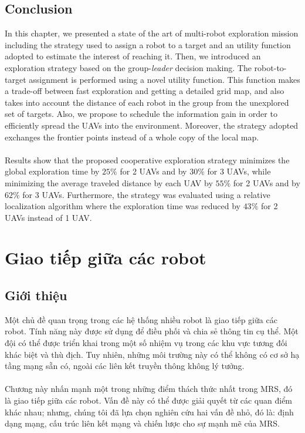\documentclass[11pt,openany]{book}
\begin{document}
\section{Conclusion}
In this chapter, we presented a state of the art of multi-robot exploration mission including the strategy used to assign a robot to a target and an utility function adopted to estimate the interest of reaching it. Then, we introduced an exploration strategy based on the group-\textit{leader} decision making. The robot-to-target assignment is performed using a novel utility function. This function makes a trade-oﬀ between fast exploration and getting a detailed grid map, and also takes into account the distance of each robot in the group from the unexplored set of targets. Also, we propose to schedule the information gain in order to eﬃciently spread the UAVs into the environment. Moreover, the strategy adopted exchanges the frontier points instead of a whole copy of the local map.\\\\
Results show that the proposed cooperative exploration strategy minimizes the global exploration time by $25\%$ for 2 UAVs and by $30\%$ for 3 UAVs, while minimizing the average traveled distance by each UAV by $55\%$ for 2 UAVs and by $62\%$ for 3 UAVs. Furthermore, the strategy was evaluated using a relative localization algorithm where the exploration time was reduced by $43\%$ for 2 UAVs instead of 1 UAV.
\chapter{Giao tiếp giữa các robot}
\section{Giới thiệu}
Một chủ đề quan trọng trong các hệ thống nhiều robot là giao tiếp giữa các robot. Tính năng này được sử dụng để điều phối và chia sẻ thông tin cụ thể. Một đội có thể được triển khai trong một số nhiệm vụ trong các khu vực tương đối khác biệt và thù địch. Tuy nhiên, những môi trường này có thể không có cơ sở hạ tầng mạng sẵn có, ngoài các liên kết truyền thông không lý tưởng.\\\\
Chương này nhấn mạnh một trong những điểm thách thức nhất trong MRS, đó là giao tiếp giữa các robot. Vấn đề này có thể được giải quyết từ các quan điểm khác nhau; nhưng, chúng tôi đã lựa chọn nghiên cứu hai vấn đề nhỏ, đó là: định dạng mạng, cấu trúc liên kết mạng và chiến lược cho sự mạnh mẽ của MRS.
\end{document}
